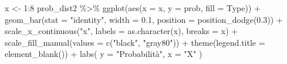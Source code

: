 \documentclass[
]{memoir}
\newenvironment{Shaded}{\begin{snugshade}}{\end{snugshade}}
\newcommand{\AttributeTok}[1]{\textcolor[rgb]{0.77,0.63,0.00}{#1}}
\newcommand{\DecValTok}[1]{\textcolor[rgb]{0.00,0.00,0.81}{#1}}
\newcommand{\FloatTok}[1]{\textcolor[rgb]{0.00,0.00,0.81}{#1}}
\newcommand{\FunctionTok}[1]{\textcolor[rgb]{0.00,0.00,0.00}{#1}}
\newcommand{\NormalTok}[1]{#1}
\newcommand{\OtherTok}[1]{\textcolor[rgb]{0.56,0.35,0.01}{#1}}
\newcommand{\SpecialCharTok}[1]{\textcolor[rgb]{0.00,0.00,0.00}{#1}}
\newcommand{\StringTok}[1]{\textcolor[rgb]{0.31,0.60,0.02}{#1}}
\begin{document}
\begin{Shaded}
\end{Shaded}

\begin{Shaded}
\begin{Highlighting}[]
\NormalTok{x }\OtherTok{\textless{}{-}} \DecValTok{1}\SpecialCharTok{:}\DecValTok{8}
\NormalTok{prob\_dist2 }\SpecialCharTok{\%\textgreater{}\%}
  \FunctionTok{ggplot}\NormalTok{(}\FunctionTok{aes}\NormalTok{(}\AttributeTok{x =}\NormalTok{ x, }\AttributeTok{y =}\NormalTok{ prob, }\AttributeTok{fill =}\NormalTok{ Type)) }\SpecialCharTok{+}
  \FunctionTok{geom\_bar}\NormalTok{(}\AttributeTok{stat =} \StringTok{"identity"}\NormalTok{, }\AttributeTok{width =} \FloatTok{0.1}\NormalTok{, }\AttributeTok{position =} \FunctionTok{position\_dodge}\NormalTok{(}\FloatTok{0.3}\NormalTok{)) }\SpecialCharTok{+}
  \FunctionTok{scale\_x\_continuous}\NormalTok{(}\StringTok{"x"}\NormalTok{, }\AttributeTok{labels =} \FunctionTok{as.character}\NormalTok{(x), }\AttributeTok{breaks =}\NormalTok{ x) }\SpecialCharTok{+}
  \FunctionTok{scale\_fill\_manual}\NormalTok{(}\AttributeTok{values =} \FunctionTok{c}\NormalTok{(}\StringTok{"black"}\NormalTok{, }\StringTok{"gray80"}\NormalTok{)) }\SpecialCharTok{+}
  \FunctionTok{theme}\NormalTok{(}\AttributeTok{legend.title =} \FunctionTok{element\_blank}\NormalTok{()) }\SpecialCharTok{+}
  \FunctionTok{labs}\NormalTok{(}
    \AttributeTok{y =} \StringTok{"Probabilità"}\NormalTok{,}
    \AttributeTok{x =} \StringTok{"X"}
\NormalTok{  )}
\end{Highlighting}
\end{Shaded}
\end{document}
